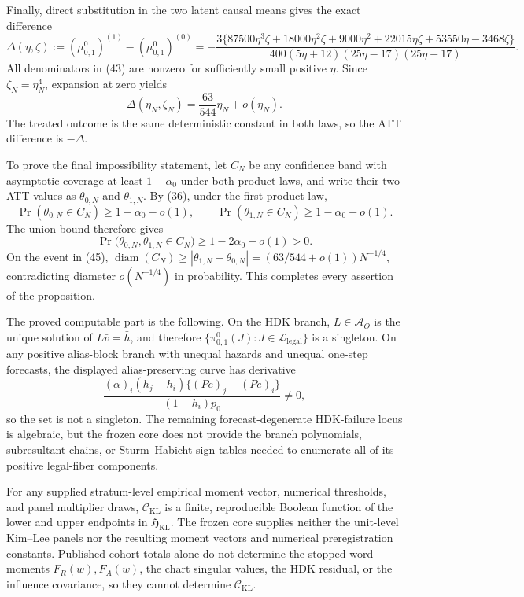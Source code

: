Finally, direct substitution in the two latent causal means gives the exact difference
\[
 \Delta(\eta,\zeta)
 :=(\mu^0_{0,1})^{(1)}-(\mu^0_{0,1})^{(0)}
 =-\frac{3\{87500\eta^3\zeta+18000\eta^2\zeta+9000\eta^2+22015\eta\zeta+53550\eta-3468\zeta\}}
 {400(5\eta+12)(25\eta-17)(25\eta+17)}.                      \tag{43}
\]
All denominators in (43) are nonzero for sufficiently small positive \(\eta\).  Since \(\zeta_N=\eta_N^4\), expansion at zero yields
\[
 \Delta(\eta_N,\zeta_N)=\frac{63}{544}\eta_N+o(\eta_N).      \tag{44}
\]
The treated outcome is the same deterministic constant in both laws, so the ATT difference is \(-\Delta\).

To prove the final impossibility statement, let \(C_N\) be any confidence band with asymptotic coverage at least \(1-\alpha_0\) under both product laws, and write their two ATT values as \(\theta_{0,N}\) and \(\theta_{1,N}\).  By (36), under the first product law,
\[
 \Pr(\theta_{0,N}\in C_N)\ge1-\alpha_0-o(1),
 \qquad
 \Pr(\theta_{1,N}\in C_N)\ge1-\alpha_0-o(1).
\]
The union bound therefore gives
\[
 \Pr\bigl(\theta_{0,N},\theta_{1,N}\in C_N\bigr)
 \ge1-2\alpha_0-o(1)>0.                                      \tag{45}
\]
On the event in (45), \(\operatorname{diam}(C_N)\ge|\theta_{1,N}-\theta_{0,N}|=(63/544+o(1))N^{-1/4}\), contradicting diameter \(o(N^{-1/4})\) in probability.  This completes every assertion of the proposition.

The proved computable part is the following.  On the HDK branch, \(L\in\mathcal A_O\) is the unique solution of \(L\bar v=\bar h\), and therefore \(\{\pi^0_{0,1}(J):J\in\mathcal L_{\mathrm{legal}}\}\) is a singleton.  On any positive alias-block branch with unequal hazards and unequal one-step forecasts, the displayed alias-preserving curve has derivative
\[
 \frac{(\alpha)_i(h_j-h_i)\{(Pe)_j-(Pe)_i\}}{(1-h_i)p_0}\ne0,
\]
so the set is not a singleton.  The remaining forecast-degenerate HDK-failure locus is algebraic, but the frozen core does not provide the branch polynomials, subresultant chains, or Sturm--Habicht sign tables needed to enumerate all of its positive legal-fiber components.

For any supplied stratum-level empirical moment vector, numerical thresholds, and panel multiplier draws, \(\mathcal C_{\mathrm{KL}}\) is a finite, reproducible Boolean function of the lower and upper endpoints in \(\mathfrak H_{\mathrm{KL}}\).  The frozen core supplies neither the unit-level Kim--Lee panels nor the resulting moment vectors and numerical preregistration constants.  Published cohort totals alone do not determine the stopped-word moments \(F_R(w),F_A(w)\), the chart singular values, the HDK residual, or the influence covariance, so they cannot determine \(\mathcal C_{\mathrm{KL}}\).
